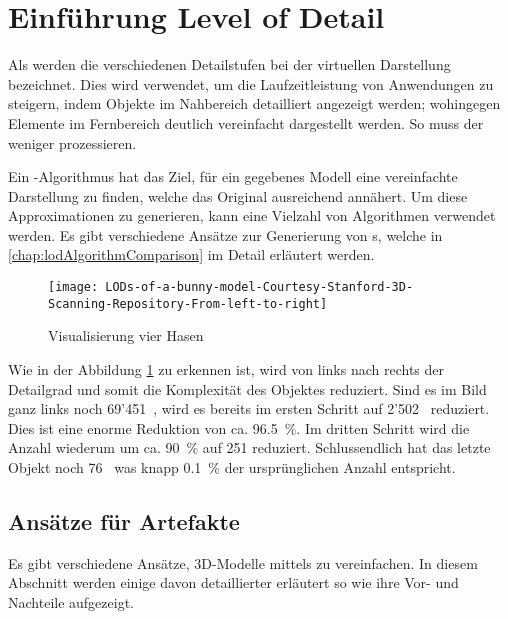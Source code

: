 \section{Einführung Level of Detail}
\label{chap:lodIntroduction}
Als  werden die verschiedenen Detailstufen bei der virtuellen Darstellung bezeichnet.
Dies wird verwendet, um die Laufzeitleistung von Anwendungen zu steigern, indem Objekte im Nahbereich detailliert angezeigt werden; wohingegen Elemente im Fernbereich deutlich vereinfacht dargestellt werden. So muss der  weniger  prozessieren.

Ein -Algorithmus hat das Ziel, für ein gegebenes Modell eine vereinfachte Darstellung zu finden, welche das Original ausreichend annähert. Um diese Approximationen zu generieren, kann eine Vielzahl von Algorithmen verwendet werden. Es gibt verschiedene Ansätze zur Generierung von s, welche in \autoref{chap:lodAlgorithmComparison} im Detail erläutert werden.

\begin{figure}[H]
\centering
\texttt{[image: LODs-of-a-bunny-model-Courtesy-Stanford-3D-Scanning-Repository-From-left-to-right]}
\caption{ Visualisierung vier Hasen \cite{stanfordBunnyModel}}
\label{fig:LevelOfDetailVisualisierungvierHasen}
\end{figure}

Wie in der Abbildung \ref{fig:LevelOfDetailVisualisierungvierHasen} zu erkennen ist, wird von links nach rechts der Detailgrad und somit die Komplexität des Objektes reduziert. Sind es im Bild ganz links noch 69'451 , wird es bereits im ersten Schritt auf 2'502  reduziert. Dies ist eine enorme Reduktion von ca. 96.5 \%. Im dritten Schritt wird die Anzahl  wiederum um ca. 90 \% auf 251 reduziert. Schlussendlich hat das letzte Objekt noch 76  was knapp 0.1 \% der ursprünglichen Anzahl entspricht.

\subsection{Ansätze für  Artefakte}
\label{chap:differentLodApproaches}
Es gibt verschiedene Ansätze, 3D-Modelle mittels  zu vereinfachen. In diesem Abschnitt werden einige davon detaillierter erläutert so wie ihre Vor- und Nachteile aufgezeigt.

